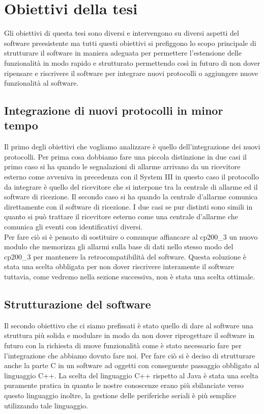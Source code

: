 \section{Obiettivi della tesi}
Gli obiettivi di questa tesi sono diversi e intervengono su diversi aspetti del software preesistente ma tutti questi obiettivi si prefiggono lo scopo principale di strutturare il software in maniera adeguata per permettere l'estensione delle funzionalità in modo rapido e strutturato permettendo così in futuro di non dover ripensare e riscrivere il software per integrare nuovi protocolli o aggiungere nuove funzionalità al software.
\subsection{Integrazione di nuovi protocolli in minor tempo}
Il primo degli obiettivi che vogliamo analizzare è quello dell'integrazione dei nuovi protocolli. Per prima cosa dobbiamo fare una piccola distinzione in due casi il primo caso si ha quando le segnalazioni di allarme arrivano da un ricevitore esterno come avveniva in precedenza con il System III  in questo caso il protocollo da integrare è quello del ricevitore che si interpone tra la centrale di allarme ed il software di ricezione. Il secondo caso si ha quando la centrale d'allarme comunica direttamente con il software di ricezione.  I due casi se pur distinti sono simili in quanto si può trattare il ricevitore esterno come una centrale d'allarme che comunica gli eventi con identificativi diversi.\\
Per fare ciò si è pensato di sostituire o comunque affiancare al cp200\_3 un nuovo modulo che memorizza gli allarmi sulla base di dati nello stesso modo del cp200\_3 per mantenere la retrocompatibilità del software. Questa soluzione è stata una scelta obbligata per non dover riscrivere interamente il software tuttavia, come vedremo nella sezione successiva, non è stata una scelta ottimale.
\subsection{Strutturazione del software}
Il secondo obiettivo che ci siamo prefissati è stato quello di dare al software una struttura più solida e modulare in modo da non dover riprogettare il software in futuro con la richiesta di nuove funzionalità come è stato necessario fare per l'integrazione che abbiamo dovuto fare noi. Per fare ciò si è deciso di strutturare anche la parte C in un software ad oggetti con conseguente passaggio obbligato al linguaggio C++. La scelta del linguaggio C++ rispetto al Java è stata una scelta puramente pratica in quanto le nostre conoscenze erano più sbilanciate verso questo linguaggio inoltre, la gestione delle periferiche seriali è più semplice utilizzando tale linguaggio.
